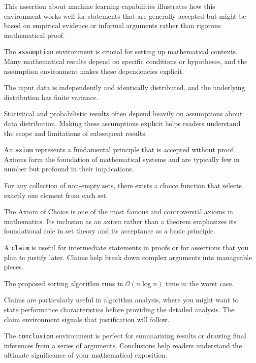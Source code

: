 \documentclass[9pt]{amsart}
\begin{document}
This assertion about machine learning capabilities illustrates how this
environment works well for statements that are generally accepted but might be
based on empirical evidence or informal arguments rather than rigorous
mathematical proof.

The \texttt{assumption} environment is crucial for setting up mathematical
contexts. Many mathematical results depend on specific conditions or
hypotheses, and the assumption environment makes these dependencies explicit.

\begin{assumption}
	The input data is independently and identically distributed, and the underlying distribution has finite variance.
\end{assumption}

Statistical and probabilistic results often depend heavily on assumptions about
data distribution. Making these assumptions explicit helps readers understand
the scope and limitations of subsequent results.

An \texttt{axiom} represents a fundamental principle that is accepted without
proof. Axioms form the foundation of mathematical systems and are typically few
in number but profound in their implications.

\begin{axiom}
	For any collection of non-empty sets, there exists a choice function that selects exactly one element from each set.
\end{axiom}

The Axiom of Choice is one of the most famous and controversial axioms in
mathematics. Its inclusion as an axiom rather than a theorem emphasizes its
foundational role in set theory and its acceptance as a basic principle.

A \texttt{claim} is useful for intermediate statements in proofs or for
assertions that you plan to justify later. Claims help break down complex
arguments into manageable pieces.

\begin{claim}
	The proposed sorting algorithm runs in $\mathcal{O}(n \log n)$ time in the worst case.
\end{claim}

Claims are particularly useful in algorithm analysis, where you might want to
state performance characteristics before providing the detailed analysis. The
claim environment signals that justification will follow.

The \texttt{conclusion} environment is perfect for summarizing results or
drawing final inferences from a series of arguments. Conclusions help readers
understand the ultimate significance of your mathematical exposition.
\end{document}
